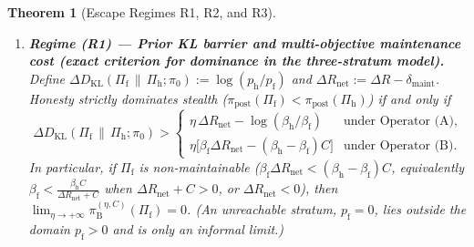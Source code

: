 \documentclass[11pt,a4paper]{article}
\newtheorem{theorem}{Theorem}
\newcommand{\DKL}{D_{\mathrm{KL}}}
\begin{document}
\begin{theorem}[Escape Regimes R1, R2, and R3]\label{thm:escape}
\leavevmode
\begin{enumerate}
  \item \textbf{Regime (R1) --- Prior KL barrier and multi-objective maintenance cost (exact criterion for dominance in the three-stratum model).} Define $\Delta \DKL(\Pi_{\mathrm{f}} \,\|\, \Pi_{\mathrm{h}}; \pi_0) := \log(p_{\mathrm{h}}/p_{\mathrm{f}})$ and $\Delta R_{\mathrm{net}} := \Delta R - \delta_{\mathrm{maint}}$. Honesty strictly dominates stealth ($\pi_{\mathrm{post}}(\Pi_{\mathrm{f}}) < \pi_{\mathrm{post}}(\Pi_{\mathrm{h}})$) if and only if
  \begin{equation}\label{eq:R1}
    \Delta \DKL(\Pi_{\mathrm{f}} \,\|\, \Pi_{\mathrm{h}}; \pi_0) >
    \begin{cases}
      \eta\,\Delta R_{\mathrm{net}} - \log(\beta_{\mathrm{h}}/\beta_{\mathrm{f}}) & \text{under Operator~(A)}, \\[4pt]
      \eta\big[\beta_{\mathrm{f}}\Delta R_{\mathrm{net}} - (\beta_{\mathrm{h}} - \beta_{\mathrm{f}})C\big] & \text{under Operator~(B)}.
    \end{cases}
  \end{equation}
  In particular, if $\Pi_{\mathrm{f}}$ is non-maintainable ($\beta_{\mathrm{f}}\Delta R_{\mathrm{net}} < (\beta_{\mathrm{h}} - \beta_{\mathrm{f}})C$, equivalently $\beta_{\mathrm{f}} < \frac{\beta_{\mathrm{h}} C}{\Delta R_{\mathrm{net}} + C}$ when $\Delta R_{\mathrm{net}} + C > 0$, or $\Delta R_{\mathrm{net}} < 0$), then $\lim_{\eta \to +\infty}\pi_{\mathrm{B}}^{(\eta, C)}(\Pi_{\mathrm{f}}) = 0$. (An unreachable stratum, $p_{\mathrm{f}} = 0$, lies outside the domain $p_{\mathrm{f}} > 0$ and is only an informal limit.)


\end{enumerate}
\end{theorem}
\end{document}
